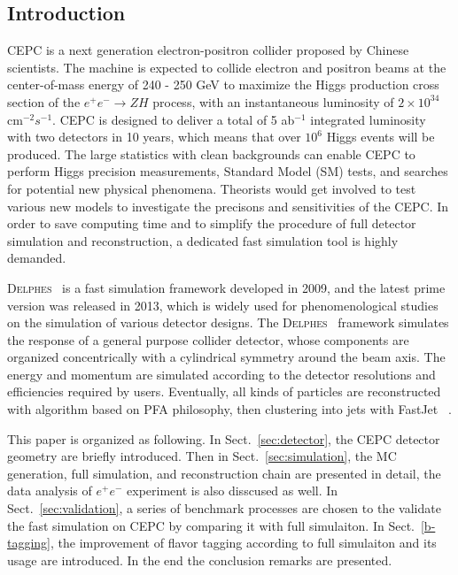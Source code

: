 \documentclass[a4paper,10pt,twoside]{cpc-hepnp}
\begin{document}
\begin{multicols}{2}


\section{Introduction}\label{sec:intro}

CEPC\cite{ref:cepc_det, ref:cepc_acc} is a next generation electron-positron collider proposed by Chinese scientists.
The machine is expected to collide electron and positron beams at the center-of-mass energy of 240 - 250 GeV
to maximize the Higgs production cross section of the $e^+e^- \to ZH$ process, with an instantaneous luminosity of $2\times10^{34}$ cm$^{-2} s^{-1}$.
CEPC is designed to deliver a total of 5 ab$^{-1}$ integrated luminosity with two detectors in 10 years,
which means that over $10^6$ Higgs events will be produced.
The large statistics with clean backgrounds can enable CEPC to perform Higgs precision measurements,
Standard Model (SM) tests, and searches for potential new physical phenomena.
Theorists would get involved to test various new models to investigate the precisons and sensitivities of the CEPC.
In order to save computing time and to simplify the procedure of full detector simulation and reconstruction,
a dedicated fast simulation tool is highly demanded.

{\textsc{Delphes}~}\cite{ref:delphes} is a fast simulation framework developed in 2009, and the latest prime version was released in 2013,
which is widely used for phenomenological studies on the simulation of various detector designs.
The {\textsc{Delphes}~} framework simulates the response of a general purpose collider detector,
whose components are organized concentrically with a cylindrical symmetry around the beam axis.
The energy and momentum are simulated according to the detector resolutions and efficiencies required by users.
Eventually, all kinds of particles are reconstructed with algorithm based on PFA\cite{ref:pfa} philosophy,
then clustering into jets with FastJet~\cite{ref:fastjet} .

This paper is organized as following.  In Sect.{~\ref{sec:detector}}, the CEPC detector geometry are briefly introduced.
Then in Sect.{~\ref{sec:simulation}}, the MC generation, full simulation, and reconstruction chain are presented in detail,
the data analysis of $e^+e^-$  experiment is also disscused as well.
In Sect.{~\ref{sec:validation}}, a series of benchmark processes are chosen to the validate the fast simulation on CEPC
by comparing it with full simulaiton.
In Sect.{~\ref{b-tagging}}, the improvement of flavor tagging according to full simulaiton and its usage are introduced.
In the end the conclusion remarks are presented.


\end{multicols}
\end{document}
